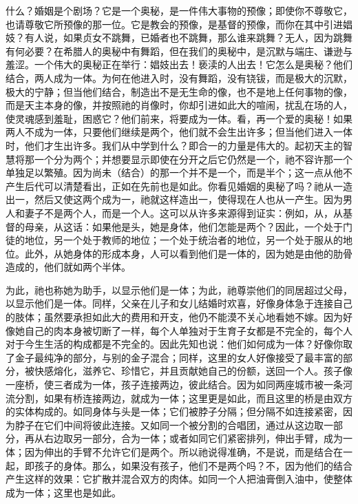 什么？婚姻是个剧场？它是一个奥秘，是一件伟大事物的预像；即使你不尊敬它，也请尊敬它所预像的那一位。它是教会的预像，是基督的预像，而你在其中引进娼妓？有人说，如果贞女不跳舞，已婚者也不跳舞，那么谁来跳舞？无人，因为跳舞有何必要？在希腊人的奥秘中有舞蹈，但在我们的奥秘中，是沉默与端庄、谦逊与羞涩。一个伟大的奥秘正在举行：娼妓出去！亵渎的人出去！它怎么是奥秘？他们结合，两人成为一体。为何在他进入时，没有舞蹈，没有铙钹，而是极大的沉默，极大的宁静；但当他们结合，制造出不是无生命的像，也不是地上任何事物的像，而是天主本身的像，并按照祂的肖像时，你却引进如此大的喧闹，扰乱在场的人，使灵魂感到羞耻，困惑它？他们前来，将要成为一体。看，再一个爱的奥秘！如果两人不成为一体，只要他们继续是两个，他们就不会生出许多；但当他们进入一体时，他们才生出许多。我们从中学到什么？即合一的力量是伟大的。起初天主的智慧将那一个分为两个；并想要显示即使在分开之后它仍然是一个，祂不容许那一个单独足以繁殖。因为尚未（结合）的那一个并不是一个，而是半个；这一点从他不产生后代可以清楚看出，正如在先前也是如此。你看见婚姻的奥秘了吗？祂从一造出一，然后又使这两个成为一，祂就这样造出一，使得现在人也从一产生。因为男人和妻子不是两个人，而是一个人。这可以从许多来源得到证实：例如，从，从基督的母亲，从这话：如果他是头，她是身体，他们怎能是两个？因此，一个处于门徒的地位，另一个处于教师的地位；一个处于统治者的地位，另一个处于服从的地位。此外，从她身体的形成本身，人可以看到他们是一体的，因为她是由他的肋骨造成的，他们就如两个半体。\par

为此，祂也称她为助手，以显示他们是一体；为此，祂尊崇他们的同居超过父母，以显示他们是一体。同样，父亲在儿子和女儿结婚时欢喜，好像身体急于连接自己的肢体；虽然要承担如此大的费用和开支，他仍不能漠不关心地看她不嫁。因为好像她自己的肉本身被切断了一样，每个人单独对于生育子女都是不完全的，每个人对于今生生活的构成都是不完全的。因此先知也说：他们如何成为一体？好像你取了金子最纯净的部分，与别的金子混合；同样，这里的女人好像接受了最丰富的部分，被快感熔化，滋养它、珍惜它，并且贡献她自己的份额，送回一个人。孩子像一座桥，使三者成为一体，孩子连接两边，彼此结合。因为如同两座城市被一条河流分割，如果有桥连接两边，就成为一体；这里更是如此，而且这里的桥是由双方的实体构成的。如同身体与头是一体；它们被脖子分隔；但分隔不如连接紧密，因为脖子在它们中间将彼此连接。又如同一个被分割的合唱团，通过从这边取一部分，再从右边取另一部分，合为一体；或者如同它们紧密排列，伸出手臂，成为一体；因为伸出的手臂不允许它们是两个。所以祂说得准确，不是说，而是结合在一起，即孩子的身体。那么，如果没有孩子，他们不是两个吗？不，因为他们的结合产生这样的效果：它扩散并混合双方的肉体。如同一个人把油膏倒入油中，使整体成为一体；这里也是如此。\par

